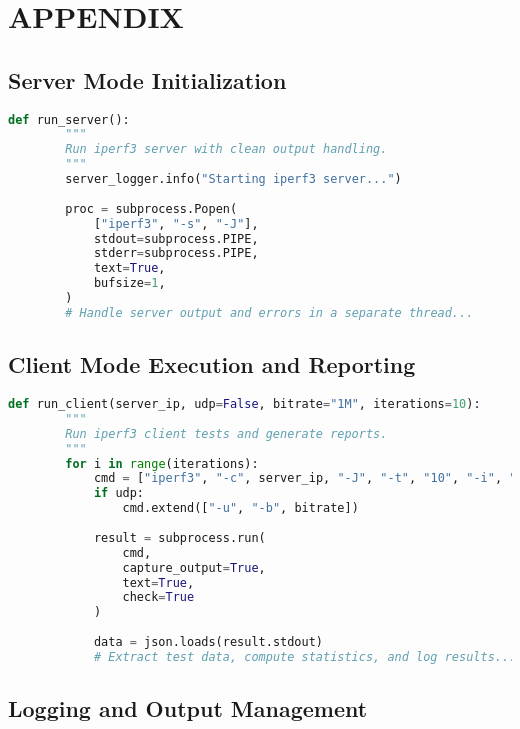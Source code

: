 
\section{APPENDIX} \label{sec:appendix}

    \subsection*{Server Mode Initialization}

        \begin{lstlisting}[language=Python, caption={Excerpt for server mode initialization.}]
      def run_server(): 
        """
        Run iperf3 server with clean output handling. 
        """
        server_logger.info("Starting iperf3 server...")
        
        proc = subprocess.Popen(
            ["iperf3", "-s", "-J"],
            stdout=subprocess.PIPE,
            stderr=subprocess.PIPE,
            text=True,
            bufsize=1,
        )
        # Handle server output and errors in a separate thread...
        \end{lstlisting}

    \subsection*{Client Mode Execution and Reporting}

        \begin{lstlisting}[language=Python, caption={Excerpt for client mode execution.}]
      def run_client(server_ip, udp=False, bitrate="1M", iterations=10):
        """
        Run iperf3 client tests and generate reports.
        """
        for i in range(iterations):
            cmd = ["iperf3", "-c", server_ip, "-J", "-t", "10", "-i", "1"]
            if udp:
                cmd.extend(["-u", "-b", bitrate])
            
            result = subprocess.run(
                cmd,
                capture_output=True,
                text=True,
                check=True
            )
            
            data = json.loads(result.stdout)
            # Extract test data, compute statistics, and log results...
        \end{lstlisting}

    \subsection*{Logging and Output Management}


